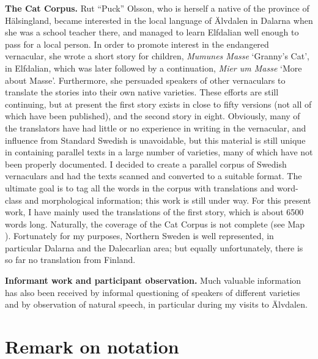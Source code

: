 \begin{styleBodytextC}
\textbf{The Cat Corpus. }Rut “Puck” Olsson, who is herself a native of the province of Hälsingland, became interested in the local language of Älvdalen in Dalarna when she was a school teacher there, and managed to learn Elfdalian well enough to pass for a local person. In order to promote interest in the endangered vernacular, she wrote a short story for children, \textit{Mumunes Masse} ‘Granny’s Cat’, in Elfdalian, which was later followed by a continuation, \textit{Mier um Masse} ‘More about Masse’. Furthermore, she persuaded speakers of other vernaculars to translate the stories into their own native varieties. These efforts are still continuing, but at present the first story exists in close to fifty versions (not all of which have been published), and the second story in eight. Obviously, many of the translators have had little or no experience in writing in the vernacular, and influence from Standard Swedish is unavoidable, but this material is still unique in containing parallel texts in a large number of varieties, many of which have not been properly documented. I decided to create a parallel corpus of Swedish vernaculars and had the texts scanned and converted to a suitable format. The ultimate goal is to tag all the words in the corpus with translations and word-class and morphological information; this work is still under way. For this present work, I have mainly used the translations of the first story, which is about 6500 words long. Naturally, the coverage of the Cat Corpus is not complete (see Map ). Fortunately for my purposes, Northern Sweden is well represented, in particular Dalarna and the Dalecarlian area; but equally unfortunately, there is so far no translation from Finland. 

\end{styleBodytextC}

\begin{styleBodytextC}
\textbf{Informant work and participant observation. }Much\textbf{ }valuable information has also been received by informal questioning of speakers of different varieties and by observation of natural speech, in particular during my visits to Älvdalen. 

\end{styleBodytextC}

\section{Remark on notation}

